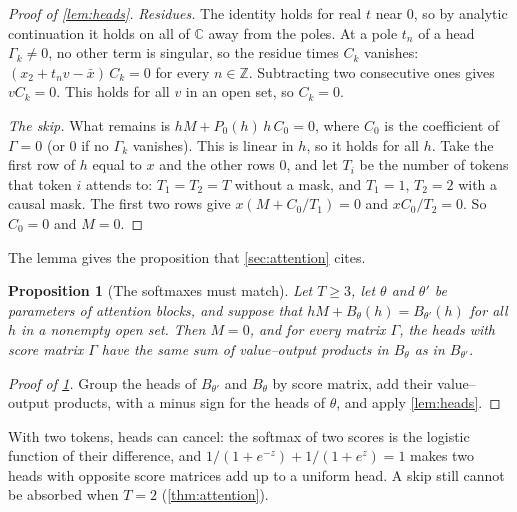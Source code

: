 \documentclass[10pt]{article}
\newtheorem{proposition}[theorem]{Proposition}
\theoremstyle{definition}
\theoremstyle{remark}
\begin{document}
\begin{proof}[Proof of \cref{lem:heads}]
\emph{Residues.} The identity holds for real $t$ near $0$, so by analytic continuation it holds on all of $\mathbb{C}$ away from the poles. At a pole $t_n$ of a head $\Gamma_k \neq 0$, no other term is singular, so the residue times $C_k$ vanishes: $(x_2 + t_nv - \bar x)\, C_k = 0$ for every $n \in \mathbb{Z}$. Subtracting two consecutive ones gives $vC_k = 0$. This holds for all $v$ in an open set, so $C_k = 0$.

\emph{The skip.} What remains is $hM + P_0(h)\,h\,C_0 = 0$, where $C_0$ is the coefficient of $\Gamma = 0$ (or $0$ if no $\Gamma_k$ vanishes). This is linear in $h$, so it holds for all $h$. Take the first row of $h$ equal to $x$ and the other rows $0$, and let $T_i$ be the number of tokens that token $i$ attends to: $T_1 = T_2 = T$ without a mask, and $T_1 = 1$, $T_2 = 2$ with a causal mask. The first two rows give $x(M + C_0/T_1) = 0$ and $xC_0/T_2 = 0$. So $C_0 = 0$ and $M = 0$.
\end{proof}

The lemma gives the proposition that \cref{sec:attention} cites.
\begin{proposition}[The softmaxes must match]\label{prop:match}
Let $T \ge 3$, let $\theta$ and $\theta'$ be parameters of attention blocks, and suppose that $hM + B_\theta(h) = B_{\theta'}(h)$ for all $h$ in a nonempty open set. Then $M = 0$, and for every matrix $\Gamma$, the heads with score matrix $\Gamma$ have the same sum of value--output products in $B_\theta$ as in $B_{\theta'}$.
\end{proposition}

\begin{proof}[Proof of \cref{prop:match}]
Group the heads of $B_{\theta'}$ and $B_\theta$ by score matrix, add their value--output products, with a minus sign for the heads of $\theta$, and apply \cref{lem:heads}.
\end{proof}

With two tokens, heads can cancel: the softmax of two scores is the logistic function of their difference, and $1/(1 + e^{-z}) + 1/(1 + e^{z}) = 1$ makes two heads with opposite score matrices add up to a uniform head. A skip still cannot be absorbed when $T = 2$ (\cref{thm:attention}).

\thmAttnNet*
\end{document}
